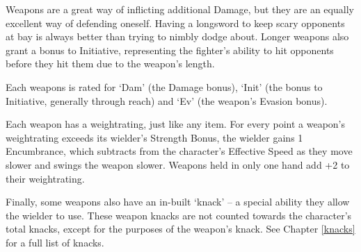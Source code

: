 \begin{multicols}{2}

\noindent
Weapons are a great way of inflicting additional Damage, but they are an equally excellent way of defending oneself. Having a longsword to keep scary opponents at bay is always better than trying to nimbly dodge about. Longer weapons also grant a bonus to Initiative, representing the fighter's ability to hit opponents before they hit them due to the weapon's length.

Each weapons is rated for `Dam' (the Damage bonus), `Init' (the bonus to Initiative, generally through reach) and `Ev' (the weapon's Evasion bonus).

Each weapon has a \gls{weightrating}, just like any item.
For every point a weapon's \gls{weightrating} exceeds its wielder's Strength Bonus, the wielder gains 1 Encumbrance, which subtracts from the character's Effective Speed as they move slower and swings the weapon slower.
Weapons held in only one hand add +2 to their \gls{weightrating}.

Finally, some weapons also have an in-built `knack' -- a special ability they allow the wielder to use.
These weapon knacks are not counted towards the character's total knacks, except for the purposes of the weapon's knack.
See Chapter \ref{knacks} for a full list of knacks.

\end{multicols}

